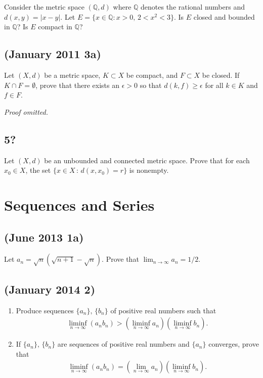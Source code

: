 Consider the metric space \((\mathbb{Q},d)\) where \(\mathbb{Q}\)
denotes the rational numbers and \(d(x,y)=|x-y|\). Let
\(E=\{x\in\mathbb{Q}:x>0,\,2<x^2<3\}\). Is \(E\) closed and bounded in
\(\mathbb{Q}\)? Is \(E\) compact in \(\mathbb{Q}\)?

\hypertarget{january-2011-3a}{%
\subsection{(January 2011 3a)}\label{january-2011-3a}}

Let \((X,d)\) be a metric space, \(K\subset X\) be compact, and
\(F\subset X\) be closed. If \(K\cap F=\emptyset\), prove that there
exists an \(\epsilon>0\) so that \(d(k,f)\geq \epsilon\) for all
\(k\in K\) and \(f\in F\).

\emph{Proof omitted.}

\hypertarget{section-18}{%
\subsection{5?}\label{section-18}}

Let \((X,d)\) be an unbounded and connected metric space. Prove that for
each \(x_0 \in X\), the set \(\{x \in X \, \colon \, d(x,x_0) = r\}\) is
nonempty.

\hypertarget{sequences-and-series}{%
\section{Sequences and Series}\label{sequences-and-series}}

\hypertarget{june-2013-1a}{%
\subsection{(June 2013 1a)}\label{june-2013-1a}}

Let \(a_n =\sqrt{n}\left(\sqrt{n+1}-\sqrt{n}\right)\). Prove that
\(\lim_{n\to\infty}a_n=1/2\).

\hypertarget{january-2014-2}{%
\subsection{(January 2014 2)}\label{january-2014-2}}

\begin{enumerate}
\def\labelenumi{\arabic{enumi}.}
\item
  Produce sequences \(\{a_n\},\,\{b_n\}\) of positive real numbers such
  that
  \begin{align*}\liminf_{n\to\infty}(a_nb_n)>\left(\liminf_{n\to\infty} a_n\right) \left(\liminf_{n\to\infty} b_n\right).\end{align*}
\item
  If \(\{a_n\},\,\{b_n\}\) are sequences of positive real numbers and
  \(\{a_n\}\) converges, prove that
  \begin{align*}\liminf_{n\to\infty}(a_nb_n)=\left(\lim_{n\to\infty}a_n\right)\left(\liminf_{n\to\infty}b_n\right).\end{align*}
\end{enumerate}

